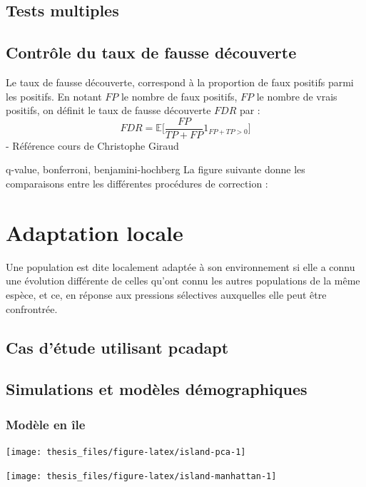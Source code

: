 \documentclass[12pt,twoside]{ugathesis}
\begin{document}
  \section{Tests multiples}\label{tests-multiples}
  
  \section{Contrôle du taux de fausse
  découverte}\label{controle-du-taux-de-fausse-decouverte}
  
  Le taux de fausse découverte, correspond à la proportion de faux
  positifs parmi les positifs. En notant \(FP\) le nombre de faux
  positifs, \(FP\) le nombre de vrais positifs, on définit le taux de
  fausse découverte \(FDR\) par :
  \[ FDR = \mathbb{E}\Big[\frac{FP}{TP + FP} 1_{FP+TP > 0}\Big] \] -
  Référence cours de Christophe Giraud
  
  q-value, bonferroni, benjamini-hochberg La figure suivante donne les
  comparaisons entre les différentes procédures de correction :
  
  \chapter{Adaptation locale}\label{adaptation-locale-1}
  
  Une population est dite localement adaptée à son environnement si elle a
  connu une évolution différente de celles qu'ont connu les autres
  populations de la même espèce, et ce, en réponse aux pressions
  sélectives auxquelles elle peut être confrontrée.
  
  \section{Cas d'étude utilisant
  pcadapt}\label{cas-detude-utilisant-pcadapt}
  
  \section{Simulations et modèles
  démographiques}\label{simulations-et-modeles-demographiques}
  
  \subsection{Modèle en île}\label{modele-en-ile}
  \begin{center}\texttt{[image: thesis\_files/figure-latex/island-pca-1]} \end{center}
  \begin{center}\texttt{[image: thesis\_files/figure-latex/island-manhattan-1]} \end{center}
  
\end{document}
